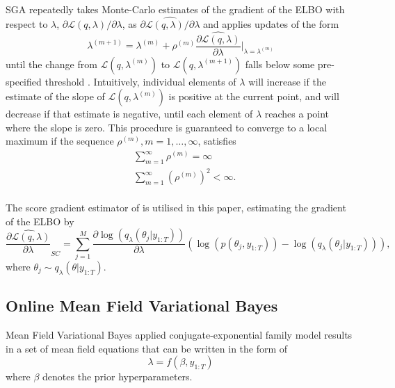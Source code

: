\documentclass[12pt,a4paper]{article}\usepackage[]{graphicx}\usepackage[]{color}
\begin{document}
SGA repeatedly takes Monte-Carlo estimates of the gradient of the ELBO with respect to $\lambda$, $\partial\mathcal{L}(q, \lambda) / \partial \lambda$, as $\widehat{\partial\mathcal{L}(q, \lambda) / \partial \lambda}$ and applies updates of the form
\begin{equation}
\label{gradientAscent}
\lambda^{(m+1)} = \lambda^{(m)} + \rho^{(m)} \widehat{\frac{\partial\mathcal{L}(q, \lambda)}{\partial \lambda}} \bigg\rvert_{\lambda = \lambda^{(m)}}
\end{equation}
until the change from $\mathcal{L}(q, \lambda^{(m)})$ to $\mathcal{L}(q, \lambda^{(m+1)})$ falls below some pre-specified threshold \citep{Hoffman2013}. Intuitively, individual elements of $\lambda$ will increase if the estimate of the slope of $\mathcal{L}(q, \lambda^{(m)})$ is positive at the current point, and will decrease if that estimate is negative, until each element of $\lambda$ reaches a point where the slope is zero. This procedure is guaranteed to converge to a local maximum \citep{Robbins1951} if the sequence $\rho^{(m)}, m = 1, \dots, \infty$, satisfies
\begin{align}
&\sum_{m=1}^{\infty} \rho^{(m)} =  \infty \\
&\sum_{m=1}^{\infty} (\rho^{(m)})^2 <  \infty.
\end{align}
\\

The score gradient estimator of \citet{Ranganath2014} is utilised in this paper, estimating the gradient of the ELBO by
\begin{equation}
\label{scoreDeriv}
\widehat{\frac{\partial\mathcal{L}(q, \lambda)}{\partial \lambda}}_{SC} = \sum_{j = 1}^M \frac{\partial \log(q_{\lambda}(\theta_{j} | y_{1:T}))}{\partial \lambda} \left(\log(p(\theta_{j}, y_{1:T})) - \log(q_{\lambda}(\theta_{j} | y_{1:T})) \right),
\end{equation}
where $\theta_{j} \sim q_{\lambda}(\theta | y_{1:T})$.

\subsection{Online Mean Field Variational Bayes}
\label{subsec:OnlineMFVB}

Mean Field Variational Bayes applied conjugate-exponential family model results in a set of mean field equations that can be written in the form of 
\begin{equation}
\lambda = f(\beta, y_{1:T}) \label{OnlineMFVB:OfflineEq}
\end{equation}
where $\beta$ denotes the prior hyperparameters. 
\\
\end{document}

